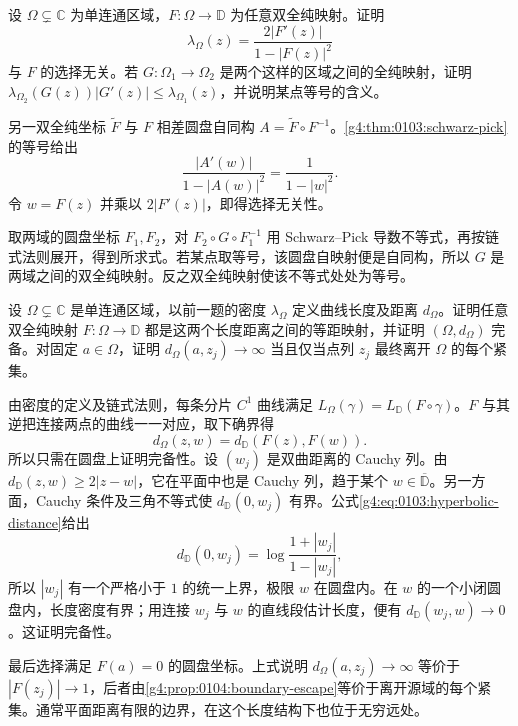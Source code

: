 \begin{exercise}
	\label{g4:ex:0101:transport-metric}
	设 \(\Omega\subsetneq\mathbb C\) 为单连通区域，\(F:\Omega\to\mathbb D\) 为任意双全纯映射。证明
	\[
		\lambda_\Omega(z)=\frac{2|F'(z)|}{1-|F(z)|^2}
	\]
	与 \(F\) 的选择无关。若 \(G:\Omega_1\to\Omega_2\) 是两个这样的区域之间的全纯映射，证明 \(\lambda_{\Omega_2}(G(z))|G'(z)|\le\lambda_{\Omega_1}(z)\)，并说明某点等号的含义。
\end{exercise}
\begin{solution}
	另一双全纯坐标 \(\widetilde F\) 与 \(F\) 相差圆盘自同构 \(A=\widetilde F\circ F^{-1}\)。\cref{g4:thm:0103:schwarz-pick}的等号给出
	\[
		\frac{|A'(w)|}{1-|A(w)|^2}=\frac1{1-|w|^2}.
	\]
	令 \(w=F(z)\) 并乘以 \(2|F'(z)|\)，即得选择无关性。

	取两域的圆盘坐标 \(F_1,F_2\)，对 \(F_2\circ G\circ F_1^{-1}\) 用 Schwarz--Pick 导数不等式，再按链式法则展开，得到所求式。若某点取等号，该圆盘自映射便是自同构，所以 \(G\) 是两域之间的双全纯映射。反之双全纯映射使该不等式处处为等号。
\end{solution}

\begin{exercise}
	\label{g4:ex:0101:boundary-escape}
	设 \(\Omega\subsetneq\mathbb C\) 是单连通区域，以前一题的密度 \(\lambda_\Omega\) 定义曲线长度及距离 \(d_\Omega\)。证明任意双全纯映射 \(F:\Omega\to\mathbb D\) 都是这两个长度距离之间的等距映射，并证明 \((\Omega,d_\Omega)\) 完备。对固定 \(a\in\Omega\)，证明 \(d_\Omega(a,z_j)\to\infty\) 当且仅当点列 \(z_j\) 最终离开 \(\Omega\) 的每个紧集。
\end{exercise}
\begin{solution}
	由密度的定义及链式法则，每条分片 \(C^1\) 曲线满足 \(L_\Omega(\gamma)=L_{\mathbb D}(F\circ\gamma)\)。\(F\) 与其逆把连接两点的曲线一一对应，取下确界得
	\[
		d_\Omega(z,w)=d_{\mathbb D}(F(z),F(w)).
	\]
	所以只需在圆盘上证明完备性。设 \((w_j)\) 是双曲距离的 Cauchy 列。由 \(d_{\mathbb D}(z,w)\ge2|z-w|\)，它在平面中也是 Cauchy 列，趋于某个 \(w\in\overline{\mathbb D}\)。另一方面，Cauchy 条件及三角不等式使 \(d_{\mathbb D}(0,w_j)\) 有界。公式\eqref{g4:eq:0103:hyperbolic-distance}给出
	\[
		d_{\mathbb D}(0,w_j)=\log\frac{1+|w_j|}{1-|w_j|},
	\]
	所以 \(|w_j|\) 有一个严格小于 \(1\) 的统一上界，极限 \(w\) 在圆盘内。在 \(w\) 的一个小闭圆盘内，长度密度有界；用连接 \(w_j\) 与 \(w\) 的直线段估计长度，便有 \(d_{\mathbb D}(w_j,w)\to0\)。这证明完备性。

	最后选择满足 \(F(a)=0\) 的圆盘坐标。上式说明 \(d_\Omega(a,z_j)\to\infty\) 等价于 \(|F(z_j)|\to1\)，后者由\cref{g4:prop:0104:boundary-escape}等价于离开源域的每个紧集。通常平面距离有限的边界，在这个长度结构下也位于无穷远处。
\end{solution}
